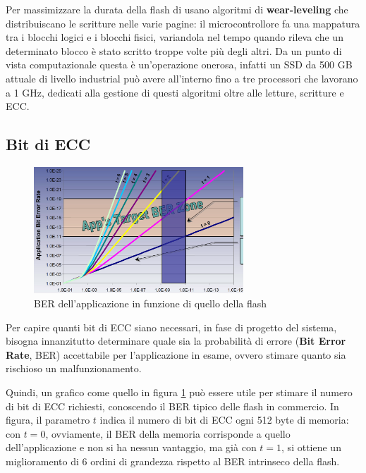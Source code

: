 \documentclass[11pt,4paper]{report}
\begin{document}
Per massimizzare la durata della flash di usano algoritmi di \textbf{wear-leveling} che distribuiscano le scritture nelle varie pagine: il microcontrollore fa una mappatura tra i blocchi logici e i blocchi fisici, variandola nel tempo quando rileva che un determinato blocco è stato scritto troppe volte più degli altri. Da un punto di vista computazionale questa è un'operazione onerosa, infatti un SSD da 500 GB attuale di livello industrial può avere all'interno fino a tre processori che lavorano a 1 GHz, dedicati alla gestione di questi algoritmi oltre alle letture, scritture e ECC.

\subsection{Bit di ECC}
\begin{figure}[hbtp]
	\centering
	\includegraphics[width=0.7\textwidth]{memorie/jc_ber}
	\caption{BER dell'applicazione in funzione di quello della flash}
	\label{fig:jc_ber}
\end{figure}
Per capire quanti bit di ECC siano necessari, in fase di progetto del sistema, bisogna innanzitutto determinare quale sia la probabilità di errore (\textbf{Bit Error Rate}, BER) accettabile per l'applicazione in esame, ovvero stimare quanto sia rischioso un malfunzionamento.

Quindi, un grafico come quello in figura \ref{fig:jc_ber} può essere utile per stimare il numero di bit di ECC richiesti, conoscendo il BER tipico delle flash in commercio. In figura, il parametro $t$ indica il numero di bit di ECC ogni 512 byte di memoria: con $t=0$, ovviamente, il BER della memoria corrisponde a quello dell'applicazione e non si ha nessun vantaggio, ma già con $t=1$, si ottiene un miglioramento di 6 ordini di grandezza rispetto al BER intrinseco della flash.
\end{document}
